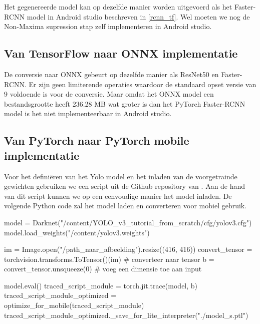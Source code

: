 Het gegenereerde model kan op dezelfde manier worden uitgevoerd als het Faster-RCNN model in Android studio beschreven in \ref{rcnn_tf}.
Wel moeten we nog de Non-Maxima supression stap zelf implementeren in Android studio.

\subsection{Van TensorFlow naar ONNX implementatie}
De conversie naar ONNX gebeurt op dezelfde manier als ResNet50 en Faster-RCNN.
Er zijn geen limiterende operaties waardoor de standaard opset versie van 9 voldoende is voor de conversie.
Maar omdat het ONNX model een bestandsgrootte heeft 236.28 MB wat groter is dan het PyTorch Faster-RCNN model is het niet implementeerbaar in Android studio.

\subsection{Van PyTorch naar PyTorch mobile implementatie}
Voor het defini\"eren van het Yolo model en het inladen van de voorgetrainde gewichten gebruiken we een script uit de Github repository van \cite{kathuria_pytorch_2022} .
Aan de hand van dit script kunnen we op een eenvoudige manier het model inladen.
De volgende Python code zal het model laden en converteren voor mobiel gebruik.

\begin{python}
model = Darknet("/content/YOLO_v3_tutorial_from_scratch/cfg/yolov3.cfg")
model.load_weights("/content/yolov3.weights")

im = Image.open("/path_naar_afbeelding").resize((416, 416))
convert_tensor = torchvision.transforms.ToTensor()(im) # converteer naar tensor
b = convert_tensor.unsqueeze(0) # voeg een dimensie toe aan input

model.eval()
traced_script_module = torch.jit.trace(model, b)
traced_script_module_optimized = optimize_for_mobile(traced_script_module)
traced_script_module_optimized._save_for_lite_interpreter("./model_s.ptl")
\end{python}

